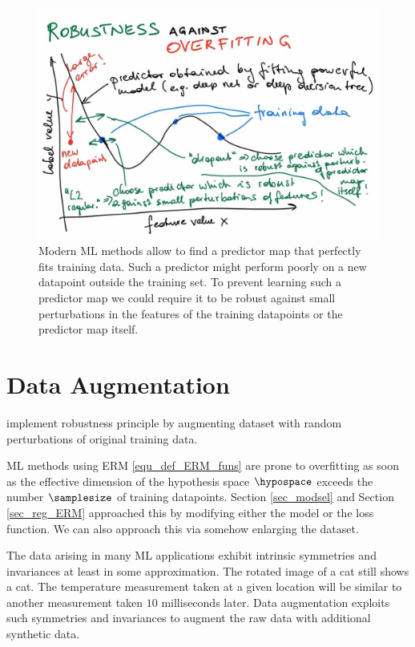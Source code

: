 \documentclass[12pt]{report}
\begin{document}
 \begin{figure}[htbp]
	\centering
	\includegraphics[width=\textwidth]{RobustnessOverfitting.jpg}  
	\caption{Modern ML methods allow to find a predictor map that perfectly fits 
		training data. Such a predictor might perform poorly on a new datapoint 
		outside the training set. To prevent learning such a predictor 
		map we could require it to be robust against small perturbations in the features of the 
        training datapoints or the predictor map itself.}
	\label{fig_polyn_training}
\end{figure}

\section{Data Augmentation} 
\label{sec_data_augmentation} 
implement robustness principle by augmenting dataset with random perturbations of original training data. 

ML methods using ERM \eqref{equ_def_ERM_funs} are prone to overfitting as soon 
as the effective dimension of the hypothesis space $\hypospace$ exceeds the number 
$\samplesize$ of training datapoints. Section \ref{sec_modsel} and Section \ref{sec_reg_ERM} 
approached this by modifying either the model or the loss function. We can also approach 
this via somehow enlarging the dataset. 

The data arising in many ML applications exhibit intrinsic symmetries and invariances at least in 
some approximation. The rotated image of a cat still shows a cat. The temperature measurement 
taken at a given location will be similar to another measurement taken $10$ milliseconds later. 
Data augmentation exploits such symmetries and invariances to augment the raw data with 
additional synthetic data. 
\end{document}
